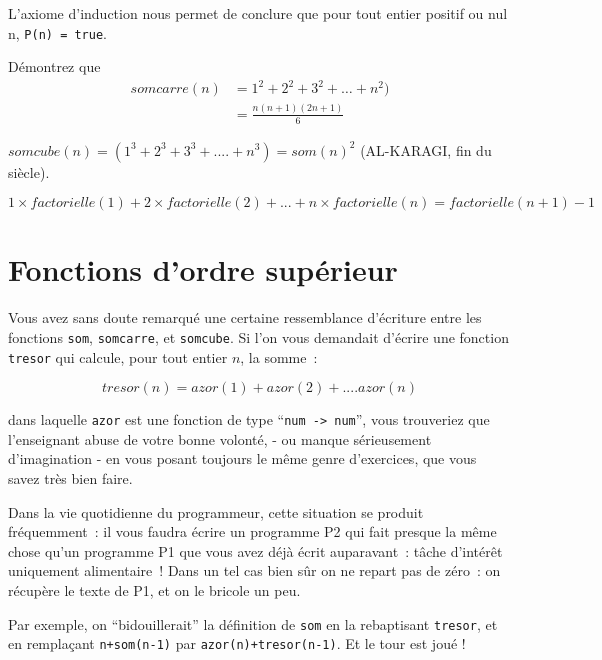 L'axiome d'induction nous permet de conclure que pour tout entier
positif ou nul n, \texttt{P(n) = true}.




\begin{exercice} Démontrez que 
$$\begin{array}{rl} 
somcarre(n) &= 1^2+2^2+3^2+\ldots+n^2) \\
	&= \frac{n(n+1)(2n+1)}{6}
\end{array}$$
\end{exercice}
\begin{exercice} $somcube(n) = (1^3+2^3+3^3+....+n^3) = som(n)^2$
  	(AL-KARAGI, fin du  siècle).\end{exercice}
\begin{exercice} $ 1\times factorielle(1)+2\times factorielle(2)+...+n\times factorielle(n) = factorielle(n+1)-1 $
\end{exercice}

\section{Fonctions d'ordre supérieur}

Vous avez sans doute remarqué une certaine ressemblance d'écriture
entre les fonctions \texttt{som}, \texttt{somcarre}, et
\texttt{somcube}. Si l'on vous demandait d'écrire une fonction \texttt{tresor}
qui calcule, pour tout entier $n$, la somme~:

\[	tresor(n) = azor(1) + azor(2) + .... azor(n) \]

dans laquelle \texttt{azor} est une fonction de type 
``\verb+num -> num+'', 
vous trouveriez que l'enseignant abuse de votre bonne volonté,
- ou manque sérieusement d'imagination - en vous posant toujours le
m\^eme genre d'exercices, que vous savez très bien faire.



Dans la vie quotidienne du programmeur, cette situation se produit
fréquemment~: il vous faudra écrire un programme P2 qui fait presque
la m\^eme chose qu'un programme P1 que vous avez déjà écrit
auparavant~: t\^ache d'intér\^et uniquement alimentaire~! Dans un tel
cas bien s\^ur on ne repart pas de zéro~: on récupère le texte de P1,
et on le bricole un peu.

Par exemple, on ``bidouillerait'' la définition de \texttt{som} en la rebaptisant
\texttt{tresor}, et en rempla\c{c}ant \texttt{n+som(n-1)} par 
\texttt{azor(n)+tresor(n-1)}. Et le
tour est joué !


